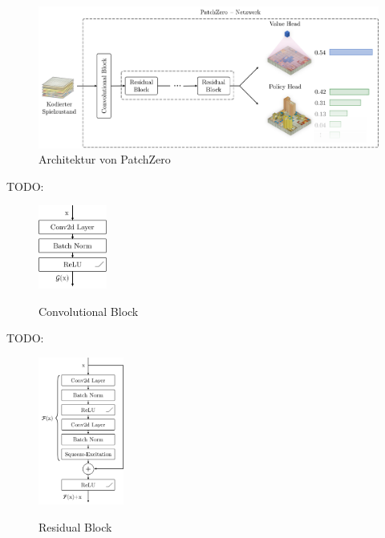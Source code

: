 \begin{figure}[!ht]
    \centering
    \includegraphics[width=\textwidth]{res/pictures/patch-zero-architecture.pdf}
    \caption{Architektur von PatchZero}
    \label{fig:patch-zero-architecture}
\end{figure}

TODO:

\begin{figure}
    \includegraphics[width=0.2\textwidth]{res/pictures/conv-block.pdf}
    \centering
    \caption[Convolutional Block]{\unskip}
    Convolutional Block
    \label{fig:conv-block}
\end{figure}

TODO:

\begin{figure}
    \includegraphics[width=0.25\textwidth]{res/pictures/res-block.pdf}
    \centering
    \caption[Residual Block]{\unskip}
    Residual Block
    \label{fig:resblock}
\end{figure}

